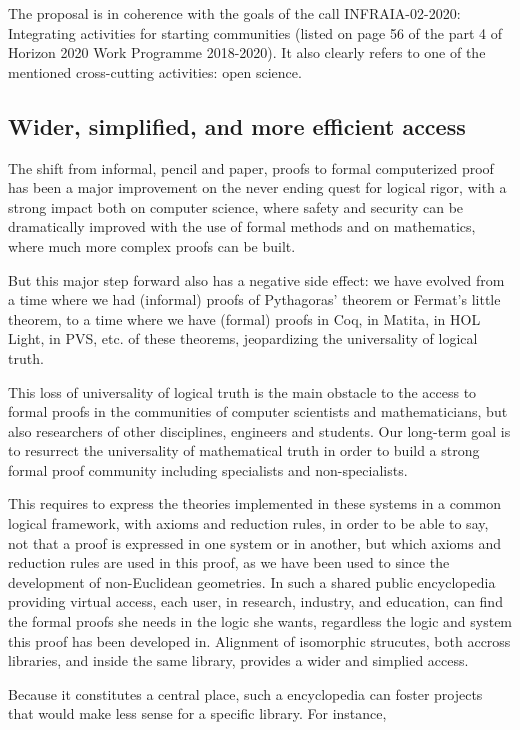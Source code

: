 The proposal is in coherence with the goals of the call INFRAIA-02-2020:
Integrating activities for starting communities (listed on page 56 of
the part 4 of Horizon 2020 Work Programme 2018-2020). It also clearly
refers to one of the mentioned cross-cutting activities: open science.

\subsection{Wider, simplified, and more efficient access}

The shift from informal, pencil and paper, proofs to formal
computerized proof has been a major improvement on the never ending
quest for logical rigor, with a strong impact both on computer
science, where safety and security can be dramatically improved with
the use of formal methods and on mathematics, where much more complex
proofs can be built.

But this major step forward also has a negative side effect: we have
evolved from a time where we had (informal) proofs of Pythagoras'
theorem or Fermat's little theorem, to a time where we have (formal)
proofs in {\sf Coq}, in {\sf Matita}, in {\sf HOL Light}, in {\sf
  PVS}, etc.  of these theorems, jeopardizing the universality of
logical truth.

This loss of universality of logical truth is the main obstacle to the
access to formal proofs in the communities of computer scientists and
mathematicians, but also researchers of other disciplines, engineers
and students.  Our long-term goal is to resurrect the universality of
mathematical truth in order to build a strong formal proof community
including specialists and non-specialists.

This requires to express the theories implemented in these systems in
a common logical framework, with axioms and reduction rules, in order
to be able to say, not that a proof is expressed in one system or in
another, but which axioms and reduction rules are used in this proof,
as we have been used to since the development of non-Euclidean
geometries. In such a shared public encyclopedia providing virtual
access, each user, in research, industry, and education, can find the
formal proofs she needs in the logic she wants, regardless the logic
and system this proof has been developed in.  Alignment of isomorphic
strucutes, both accross libraries, and inside the same library,
provides a wider and simplied access.

Because it constitutes a central place, such a encyclopedia can foster
projects that would make less sense for a specific library. For instance,

